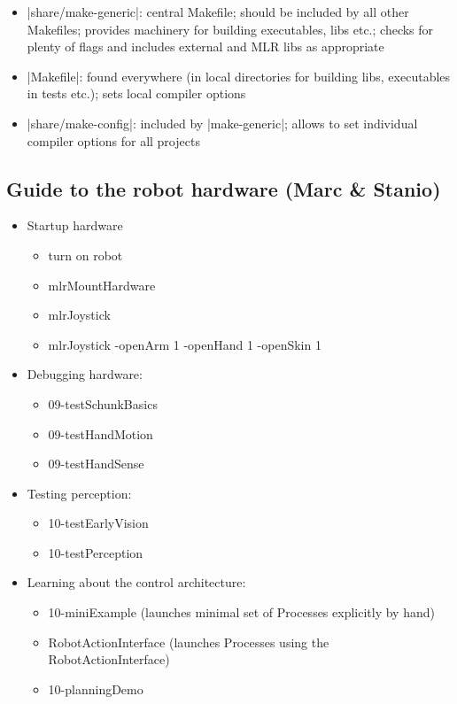 \begin{itemize}

\item |share/make-generic|: central Makefile; should be included by all
other Makefiles; provides machinery for building executables, libs etc.;
checks for plenty of flags and includes external and MLR libs as
appropriate

\item |Makefile|: found everywhere (in local directories for building
libs, executables in tests etc.); sets local compiler options

\item |share/make-config|: included by |make-generic|; allows to set
individual compiler options for all projects

\end{itemize}



\subsection{Guide to the robot hardware (Marc \& Stanio)}

\begin{itemize}
\item Startup hardware
\begin{itemize}
\item turn on robot
\item mlrMountHardware
\item mlrJoystick
\item mlrJoystick -openArm 1 -openHand 1 -openSkin 1
\end{itemize}

\item Debugging hardware:
\begin{itemize}
\item 09-testSchunkBasics
\item 09-testHandMotion
\item 09-testHandSense
\end{itemize}

\item Testing perception:
\begin{itemize}
\item 10-testEarlyVision
\item 10-testPerception
\end{itemize}

\item Learning about the control architecture:
\begin{itemize}
\item 10-miniExample (launches minimal set of Processes explicitly by hand)
\item RobotActionInterface (launches Processes using the RobotActionInterface)
\item 10-planningDemo
\end{itemize}
\end{itemize}


